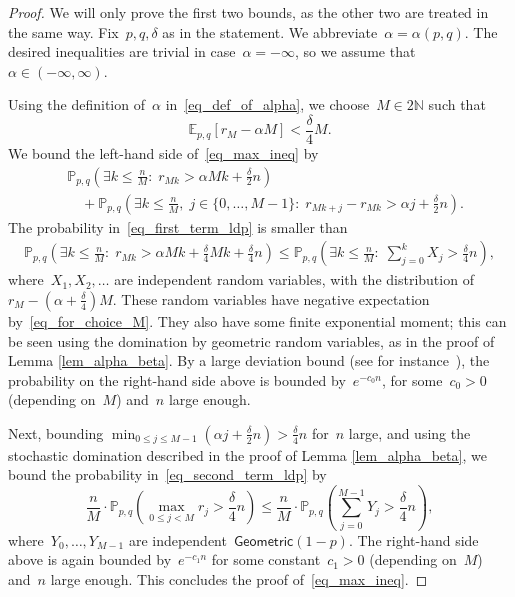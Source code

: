 \documentclass[pdflatex,sn-mathphys-num]{sn-jnl}%
\newcommand{\bbE}{{\ensuremath{\mathbb E}} }
\newcommand{\bbN}{{\ensuremath{\mathbb N}} }
\newcommand{\bbP}{{\ensuremath{\mathbb P}} }
\newcommand{\1}{{\ensuremath{\mathbf{1}}} }
\theoremstyle{thmstyleone}%
\theoremstyle{thmstyletwo}%
\theoremstyle{thmstylethree}%
\begin{document}
\begin{proof}
We will only prove the first two bounds, as the other two are treated in the same way. Fix~$p,q,\delta$ as in the statement. We abbreviate~$\alpha = \alpha(p,q)$. The desired inequalities are trivial in case~$\alpha = - \infty$, so we assume that~$\alpha \in (-\infty,\infty)$. 

Using the definition of~$\alpha$ in~\eqref{eq_def_of_alpha}, we choose~$M \in 2\bbN$ such that
\begin{equation}
\label{eq_for_choice_M}
\bbE_{p,q}[r_M - \alpha M] < \frac{\delta}{4}M.
\end{equation}
We bound the left-hand side of~\eqref{eq_max_ineq} by
\begin{align}\label{eq_first_term_ldp}
&\bbP_{p,q}\left( \exists k \le \frac{n}{M}:\; r_{Mk}   > \alpha Mk+\frac{\delta}{2} n\right) \\
&\quad + \bbP_{p,q} \left(\exists k \le \frac{n}{M},\; j \in \{0,\ldots, M-1\}: \; r_{Mk+j} - r_{Mk} > {\alpha j+}\frac{\delta}{2}n \right).\label{eq_second_term_ldp}
\end{align}
The probability in~\eqref{eq_first_term_ldp} is smaller than
\begin{align*}
\bbP_{p,q} \left( \exists k \le \frac{n}{M}:\; r_{Mk}   > \alpha Mk + \frac{\delta}{4} M k+\frac{\delta}{4} n\right) \le \bbP_{p,q}\left( \exists k \le \frac{n}{M}:\; \sum_{j=0}^{k} X_j > \frac{\delta}{4}n\right),
\end{align*}
where~$X_1,X_2,\ldots$ are independent random variables, with the distribution of~$r_M - (\alpha+\tfrac{\delta}{4}) M$. These random variables have negative expectation by~\eqref{eq_for_choice_M}. They also have some finite exponential moment; this can be seen using the domination by geometric random variables, as in the proof of Lemma \ref{lem_alpha_beta}. By a large deviation bound (see for instance~\cite[Corollary A.2.7]{Lawler10}), the probability on the right-hand side above is bounded by~$e^{-c_0 n}$, for some~$c_0 > 0$ (depending on~$M$) and~$n$ large enough.

	Next, bounding $\min_{0 \le j \le M-1} (\alpha j + \frac{\delta}{2}n) > \frac{\delta}{4}n$ for~$n$ large, and using the stochastic domination described in the proof of Lemma \ref{lem_alpha_beta},  we bound the probability in~\eqref{eq_second_term_ldp} by
	\[\frac{n}{M}\cdot \bbP_{p,q} \left(  \max_{0 \le j < M} r_j  > \frac{\delta}{4}n \right) \le \frac{n}{M} \cdot \bbP_{p,q} \left(\sum_{j=0}^{M-1} Y_j > \frac{\delta}{4}n \right),\]
	where~$Y_0,\ldots, Y_{M-1}$ are independent~$\mathsf{Geometric}(1-p)$. The right-hand side above is again bounded by~$e^{-c_1 n}$ for some constant~$c_1 > 0$ (depending on~$M$) and~$n$ large enough. This concludes the proof of~\eqref{eq_max_ineq}.


\end{proof}
\end{document}
